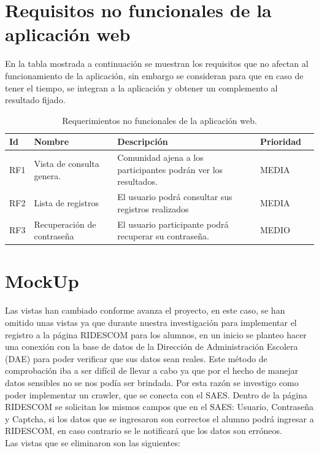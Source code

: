 	\section{Requisitos no funcionales de la aplicación web}
	En la tabla mostrada a continuación se muestran los requisitos que no afectan al funcionamiento de la aplicación, sin embargo se consideran para que en caso de tener el tiempo, se integran a la aplicación y obtener un complemento al resultado fijado.
	\begin{table}[htbp]
		\begin{center}
			\begin{tabular}{|l|p{45mm}|p{45mm}|p{45mm}|l}
				\hline
				Id & Nombre & Descripción & Prioridad \\
				\hline 
				RF1 & Vista de consulta genera. & Comunidad ajena a los participantes podrán ver los resultados. & MEDIA \\ \hline
				RF2 & Lista de registros &El usuario podrá consultar sus registros realizados & MEDIA   \\ \hline
				RF3 & Recuperación de contraseña &El usuario participante podrá recuperar su contraseña. & MEDIO \\ \hline
			\end{tabular}
			\caption{Requerimientos no funcionales de la aplicación web.}
			\label{tabla:sencilla}
		\end{center}
	\end{table}
	
	
	

	\section{MockUp}
	\noindent Las vistas han cambiado conforme avanza el proyecto, en este caso, se han omitido unas vistas ya que durante nuestra investigación para implementar el registro a la página RIDESCOM para los alumnos, en un inicio se planteo hacer una conexión con la base de datos de la Dirección de Administración Escolera (DAE) para poder verificar que sus datos sean reales. Este método de comprobación iba a ser difícil de llevar a cabo ya que por el hecho de manejar datos sensibles no se nos podía ser brindada. Por esta razón se investigo como poder implementar un crawler, que se conecta con el SAES. Dentro de la página RIDESCOM se solicitan los mismos campos que en el SAES: Usuario, Contraseña y Captcha, si los datos que se ingresaron son correctos el alumno podrá ingresar a RIDESCOM, en caso contrario se le notificará que los datos son erróneos. \\
	Las vistas que se eliminaron son las siguientes: 
	
